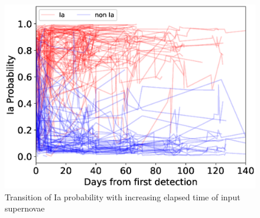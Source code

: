 \documentclass[useamsfonts]{pasj01}
\begin{document}
%
%
\begin{figure}[ht]
  \begin{center}
     \includegraphics[width=\columnwidth]{figures/n_observations_visualized_Ia_probability_191227.eps}
  \end{center}
  \caption{%
  Transition of Ia probability with increasing elapsed time of input supernovae
  }%
  \label{fig:visualized_Ia_prob}
\end{figure}
%
%
\end{document}
